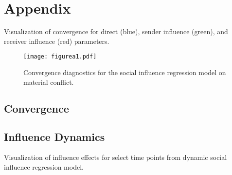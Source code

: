 \clearpage

\renewcommand{\thefigure}{A\arabic{figure}}
\setcounter{figure}{0}
\renewcommand{\thetable}{A.\arabic{table}}
\setcounter{table}{0}
\renewcommand{\thesection}{A.\arabic{section}}
\setcounter{section}{0}

\section*{\textbf{Appendix}}

Visualization of convergence for direct (blue), sender influence (green), and receiver influence (red) parameters.

\begin{figure}[ht]
\centering
\texttt{[image: figurea1.pdf]}
\caption{Convergence diagnostics for the social influence regression model on material conflict.}
\label{fig:zabConv}
\end{figure}

\clearpage
\newpage
\subsection*{Convergence}

\subsection*{Influence Dynamics}

Visualization of influence effects for select time points from dynamic social influence regression model.

